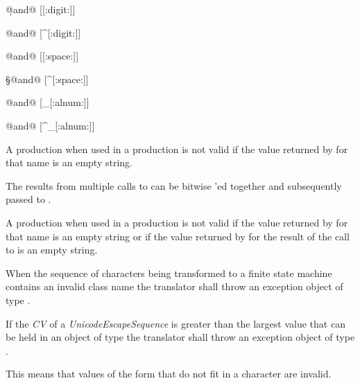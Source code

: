 \begin{outputblock}
\d @\textnormal{and}@ [[:digit:]]

\D @\textnormal{and}@ [^[:digit:]]

\s @\textnormal{and}@ [[:space:]]

\S @\textnormal{and}@ [^[:space:]]

\w @\textnormal{and}@ [_[:alnum:]]

\W @\textnormal{and}@ [^_[:alnum:]]
\end{outputblock}

\pnum
{}%
%
A  production when used in
a  production is not valid
if the value returned by  for
that name is an empty string.

\pnum
{}%
%
%
%
The results from multiple calls
to  can be bitwise 'ed
together and subsequently passed to .

\pnum
A  production when used in
a  production is not valid if the value
returned by  for that name is an
empty string or if the value returned by 
for the result of the call to 
is an empty string.

\pnum
{}%
When the sequence of characters being transformed to a finite state
machine contains an invalid class name the translator shall throw an
exception object of type .

\pnum
{}%
If the \textit{CV} of a \textit{UnicodeEscapeSequence} is greater than the largest
value that can be held in an object of type  the translator shall
throw an exception object of type .
\begin{note}
This means that values of the form  that do not fit in
a character are invalid.
\end{note}

